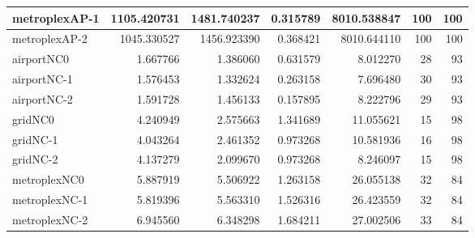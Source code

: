 \begin{longtable}{|l|r|r|r|r|r|r|}
metroplexAP-1 & 1105.420731 & 1481.740237 & 0.315789 & 8010.538847 & 100 & 100 \\ \hline
metroplexAP-2 & 1045.330527 & 1456.923390 & 0.368421 & 8010.644110 & 100 & 100 \\ \hline
airportNC0 & 1.667766 & 1.386060 & 0.631579 & 8.012270 & 28 & 93 \\ \hline
airportNC-1 & 1.576453 & 1.332624 & 0.263158 & 7.696480 & 30 & 93 \\ \hline
airportNC-2 & 1.591728 & 1.456133 & 0.157895 & 8.222796 & 29 & 93 \\ \hline
gridNC0 & 4.240949 & 2.575663 & 1.341689 & 11.055621 & 15 & 98 \\ \hline
gridNC-1 & 4.043264 & 2.461352 & 0.973268 & 10.581936 & 16 & 98 \\ \hline
gridNC-2 & 4.137279 & 2.099670 & 0.973268 & 8.246097 & 15 & 98 \\ \hline
metroplexNC0 & 5.887919 & 5.506922 & 1.263158 & 26.055138 & 32 & 84 \\ \hline
metroplexNC-1 & 5.819396 & 5.563310 & 1.526316 & 26.423559 & 32 & 84 \\ \hline
metroplexNC-2 & 6.945560 & 6.348298 & 1.684211 & 27.002506 & 33 & 84 \\ \hline
\end{longtable}
